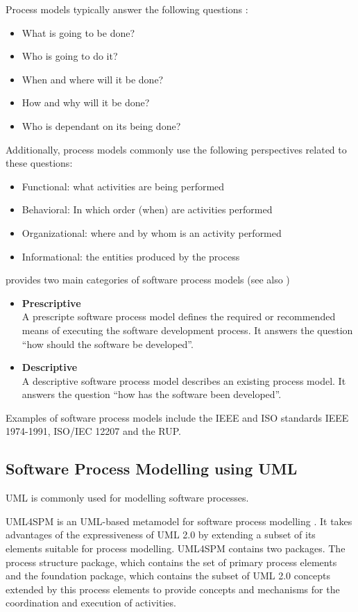 Process models typically answer the following questions \citep{Curtis:1992kf}:
\begin{itemize}
	\item What is going to be done?
	\item Who is going to do it?
	\item When and where will it be done?
	\item How and why will it be done?
	\item Who is dependant on its being done?
\end{itemize}

Additionally, process models commonly use the following perspectives related to these questions:
\begin{itemize}
	\item Functional: what activities are being performed
	\item Behavioral: In which order (when) are activities performed
	\item Organizational: where and by whom is an activity performed
	\item Informational: the entities produced by the process
\end{itemize}

\cite{McChesney:1995aa} provides two main categories of software process models (see also \cite{Acuna:2001aa})
\begin{itemize}
	\item \textbf{Prescriptive}\\
	A prescripte software process model defines the required or recommended means of executing the software development process. It answers the question ``how should the software be developed''.
	\item \textbf{Descriptive}\\
	A descriptive software process model describes an existing process model. It answers the question ``how has the software been developed''.
\end{itemize}

Examples of software process models include the IEEE and ISO standards IEEE 1974-1991, ISO/IEC 12207 and the \acf{RUP}.

\subsection{Software Process Modelling using \ac{UML}}
\ac{UML} is commonly used for modelling software processes. 

\ac{UML4SPM} is an \ac{UML}-based metamodel for software process modelling \citep{Bendraou:2005dv,Bendraou:2006aa}. It takes advantages of the expressiveness of \ac{UML} 2.0 by extending a subset of its elements suitable for process modelling. \ac{UML4SPM} contains two packages. The process structure package, which contains the set of primary process elements and the foundation package, which contains the subset of \ac{UML} 2.0 concepts extended by this process elements to provide concepts and mechanisms for the coordination and execution of activities.

